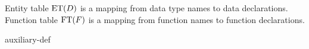 Entity table $\operatorname{ET}(D)$ is a mapping from data type names to data declarations. Function table $\operatorname{FT}(F)$ is a mapping from function names to function declarations.
\begin{defbox}
{auxiliary-def}
\end{defbox}
